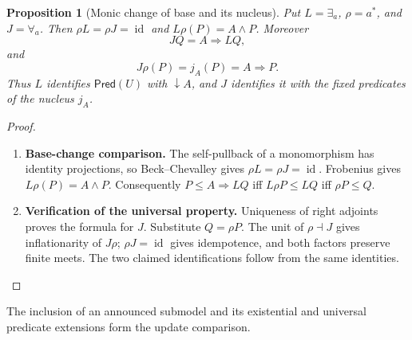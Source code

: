 \documentclass[11pt,a4paper]{article}
\numberwithin{equation}{section}
\newtheorem{proposition}[theorem]{Proposition}
\theoremstyle{definition}
\theoremstyle{remark}
\theoremstyle{plain}
\begin{document}
\begin{proposition}[Monic change of base and its nucleus]
\label{prop:egt-monic-nucleus}
Put $L=\exists_a$, $\rho=a^*$, and $J=\forall_a$.
Then $\rho L=\rho J=\operatorname{id}$ and $L\rho(P)=A\wedge P$.
Moreover
\begin{equation}\label{eq:egt-monic-right-adjoint}
 JQ=A\Rightarrow LQ,
\end{equation}
and
\begin{equation}\label{eq:egt-monic-nucleus}
 J\rho(P)=j_A(P)=A\Rightarrow P.
\end{equation}
Thus $L$ identifies $\mathsf{Pred}(U)$ with $\downarrow A$, and $J$
identifies it with the fixed predicates of the nucleus $j_A$.
\end{proposition}
\begin{proof}
\leavevmode
\begin{enumerate}[label=\textup{(\arabic*)},leftmargin=*,itemsep=4pt,topsep=3pt]
  \item \textbf{Base-change comparison.} The self-pullback of a monomorphism has identity projections, so
Beck--Chevalley gives $\rho L=\rho J=\operatorname{id}$. Frobenius gives
$L\rho(P)=A\wedge P$. Consequently
$P\leq A\Rightarrow LQ$ iff $L\rho P\leq LQ$ iff $\rho P\leq Q$.
  \item \textbf{Verification of the universal property.} Uniqueness of right adjoints proves the formula for $J$. Substitute
$Q=\rho P$. The unit of $\rho\dashv J$ gives inflationarity of $J\rho$;
$\rho J=\operatorname{id}$ gives idempotence, and both factors preserve
finite meets. The two claimed identifications follow from the same identities.
\end{enumerate}
\end{proof}

\noindent The inclusion of an announced submodel and its existential and universal predicate extensions form the update comparison.
\begin{center}
\end{center}
\end{document}
